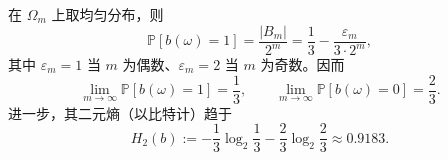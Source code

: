 \begin{corollary}\label{cor:pom-hidden-bit-entropy}
在 $\Omega_m$ 上取均匀分布，则
$$
\mathbb{P}[b(\omega)=1]=\frac{|B_m|}{2^m}
=\frac{1}{3}-\frac{\varepsilon_m}{3\cdot 2^m},
$$
其中 $\varepsilon_m=1$ 当 $m$ 为偶数、$\varepsilon_m=2$ 当 $m$ 为奇数。因而
$$
\lim_{m\to\infty}\mathbb{P}[b(\omega)=1]=\frac{1}{3},\qquad
\lim_{m\to\infty}\mathbb{P}[b(\omega)=0]=\frac{2}{3}.
$$
进一步，其二元熵（以比特计）趋于
$$
H_2(b)
:=-\frac{1}{3}\log_2\frac{1}{3}-\frac{2}{3}\log_2\frac{2}{3}
\approx 0.9183.
$$
\end{corollary}

